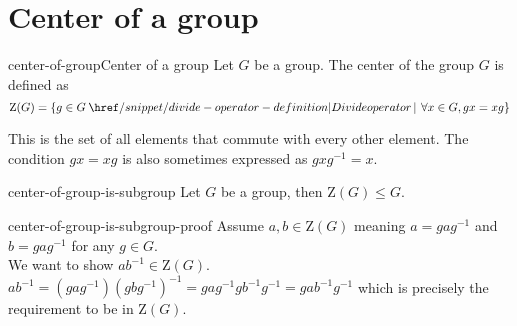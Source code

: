 \documentclass[preview]{standalone}
\begin{document}
\section{Center of a group}

\begin{snippetdefinition}{center-of-group}{Center of a group}
    Let \(G\) be a group. The center of the group \(G\) is defined as
    \[
        \text{Z}(G) = \{
            g \in G \divides \forall x \in G, gx = xg
        \}
    \]

    This is the set of all elements that commute with every other element.
    The condition \(gx=xg\) is also sometimes expressed as \(gxg^{-1} = x\).
\end{snippetdefinition}

\begin{snippettheorem}{center-of-group-is-subgroup}{}
    Let \(G\) be a group, then \(\text{Z}(G) \leq G\).
\end{snippettheorem}

\begin{snippetproof}{center-of-group-is-subgroup-proof}{}
    Assume \(a, b \in \text{Z}(G)\) meaning \(a = gag^{-1}\) and \(b = gag^{-1}\) for any \(g \in G\). \\
    We want to show \(ab^{-1} \in \text{Z}(G)\).
    \(ab^{-1} = (gag^{-1}){(gbg^{-1})}^{-1} = gag^{-1}gb^{-1}g^{-1}
    = g ab^{-1} g^{-1}\) which is precisely the requirement to be in \(\text{Z}(G)\).
\end{snippetproof}

\end{document}
